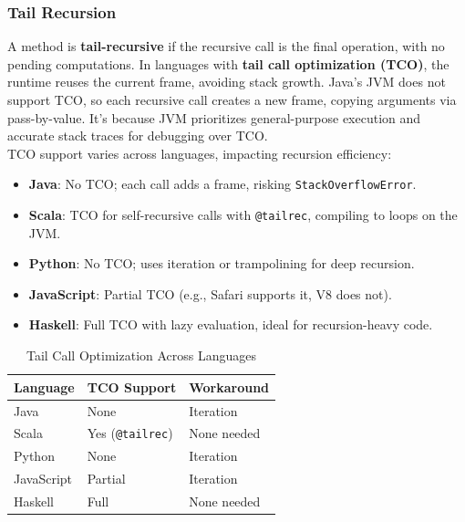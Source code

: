 \documentclass{article}
\begin{document}
\subsubsection{Tail Recursion}
A method is \textbf{tail-recursive} if the recursive call is the final operation, with no pending computations. In languages with \textbf{tail call optimization (TCO)}, the runtime reuses the current frame, avoiding stack growth. Java’s JVM does not support TCO, so each recursive call creates a new frame, copying arguments via pass-by-value.
It's because JVM prioritizes general-purpose execution and accurate stack traces for debugging over TCO.
\\
TCO support varies across languages, impacting recursion efficiency:
\begin{itemize}
	\item \textbf{Java}: No TCO; each call adds a frame, risking \texttt{StackOverflowError}.
	\item \textbf{Scala}: TCO for self-recursive calls with \texttt{@tailrec}, compiling to loops on the JVM.
	\item \textbf{Python}: No TCO; uses iteration or trampolining for deep recursion.
	\item \textbf{JavaScript}: Partial TCO (e.g., Safari supports it, V8 does not).
	\item \textbf{Haskell}: Full TCO with lazy evaluation, ideal for recursion-heavy code.
\end{itemize}
\begin{table}[h]
	\centering
	\begin{tabular}{|>{\raggedright\arraybackslash}m{2.5cm}|>{\raggedright\arraybackslash}m{3cm}|>{\raggedright\arraybackslash}m{3cm}|}
		\hline
		\textbf{Language} & \textbf{TCO Support} & \textbf{Workaround} \\
		\hline
		Java & None & Iteration \\
		Scala & Yes (\texttt{@tailrec}) & None needed \\
		Python & None & Iteration \\
		JavaScript & Partial & Iteration \\
		Haskell & Full & None needed \\
		\hline
	\end{tabular}
	\caption{Tail Call Optimization Across Languages}
\end{table}

\end{document}
